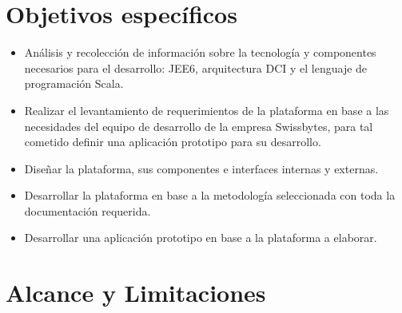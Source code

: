 \section*{Objetivos espec\'ificos}

\begin{itemize}	
  \item An\'alisis y recolecci\'on de informaci\'on sobre la
    tecnolog\'ia y componentes necesarios para el desarrollo:
    \gls{JEE6}, arquitectura \gls{DCI} y el lenguaje de programaci\'on Scala.

  \item Realizar el levantamiento de requerimientos de la
    plataforma en base a las necesidades del equipo de desarrollo de
    la empresa Swissbytes, para tal cometido definir una aplicaci\'on 
    prototipo para su desarrollo.

  \item Dise\~nar la plataforma, sus componentes e interfaces
    internas y externas.

  \item Desarrollar la plataforma en base a la metodolog\'ia
    seleccionada con toda la documentaci\'on requerida.

  \item Desarrollar una aplicaci\'on prototipo en base a la
    plataforma a elaborar.

\end{itemize}

\section*{Alcance y Limitaciones}


